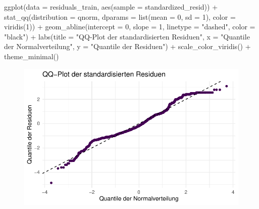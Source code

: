 \documentclass[
  letterpaper,
  DIV=11,
  numbers=noendperiod]{scrartcl}
\newenvironment{Shaded}{\begin{snugshade}}{\end{snugshade}}
\newcommand{\AttributeTok}[1]{\textcolor[rgb]{0.40,0.45,0.13}{#1}}
\newcommand{\DecValTok}[1]{\textcolor[rgb]{0.68,0.00,0.00}{#1}}
\newcommand{\FunctionTok}[1]{\textcolor[rgb]{0.28,0.35,0.67}{#1}}
\newcommand{\NormalTok}[1]{\textcolor[rgb]{0.00,0.23,0.31}{#1}}
\newcommand{\SpecialCharTok}[1]{\textcolor[rgb]{0.37,0.37,0.37}{#1}}
\newcommand{\StringTok}[1]{\textcolor[rgb]{0.13,0.47,0.30}{#1}}
\begin{document}
\begin{Shaded}
\begin{Highlighting}[]
\FunctionTok{ggplot}\NormalTok{(}\AttributeTok{data =}\NormalTok{ residuals\_train, }\FunctionTok{aes}\NormalTok{(}\AttributeTok{sample =}\NormalTok{ standardized\_resid)) }\SpecialCharTok{+}
  \FunctionTok{stat\_qq}\NormalTok{(}\AttributeTok{distribution =}\NormalTok{ qnorm, }\AttributeTok{dparams =} \FunctionTok{list}\NormalTok{(}\AttributeTok{mean =} \DecValTok{0}\NormalTok{, }\AttributeTok{sd =} \DecValTok{1}\NormalTok{), }\AttributeTok{color =} \FunctionTok{viridis}\NormalTok{(}\DecValTok{1}\NormalTok{)) }\SpecialCharTok{+}
  \FunctionTok{geom\_abline}\NormalTok{(}\AttributeTok{intercept =} \DecValTok{0}\NormalTok{, }\AttributeTok{slope =} \DecValTok{1}\NormalTok{, }\AttributeTok{linetype =} \StringTok{"dashed"}\NormalTok{, }\AttributeTok{color =} \StringTok{"black"}\NormalTok{) }\SpecialCharTok{+}
  \FunctionTok{labs}\NormalTok{(}\AttributeTok{title =} \StringTok{"QQ{-}Plot der standardisierten Residuen"}\NormalTok{,}
       \AttributeTok{x =} \StringTok{"Quantile der Normalverteilung"}\NormalTok{,}
       \AttributeTok{y =} \StringTok{"Quantile der Residuen"}\NormalTok{) }\SpecialCharTok{+}
  \FunctionTok{scale\_color\_viridis}\NormalTok{() }\SpecialCharTok{+} 
  \FunctionTok{theme\_minimal}\NormalTok{()}
\end{Highlighting}
\end{Shaded}

\begin{figure}[H]

{\centering \includegraphics{main_doc_files/figure-pdf/unnamed-chunk-121-1.pdf}

}

\end{figure}
\end{document}
